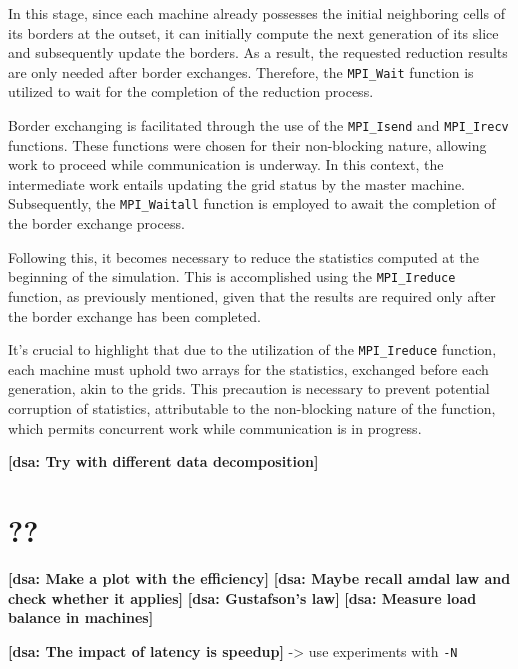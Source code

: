 \documentclass{article}
\newcommand{\dsanote}[1]{\textbf{[dsa: #1]}}
\begin{document}
In this stage, since each machine already possesses the initial neighboring cells of its borders at the outset, it 
can initially compute the next generation of its slice and subsequently update the borders. As a result, the requested 
reduction results are only needed after border exchanges. Therefore, the \texttt{MPI\_Wait} function is utilized to wait 
for the completion of the reduction process.


Border exchanging is facilitated through the use of the \texttt{MPI\_Isend} and \texttt{MPI\_Irecv} functions.
These functions were chosen for their non-blocking nature, allowing work to proceed while communication is underway. 
In this context, the intermediate work entails updating the grid status by the master machine. Subsequently, the 
\texttt{MPI\_Waitall} function is employed to await the completion of the border exchange process.

Following this, it becomes necessary to reduce the statistics computed at the beginning of the simulation. 
This is accomplished using the \texttt{MPI\_Ireduce} function, as previously mentioned, given that the results 
are required only after the border exchange has been completed.

It's crucial to highlight that due to the utilization of the \texttt{MPI\_Ireduce} function, each machine must uphold 
two arrays for the statistics, exchanged before each generation, akin to the grids. This precaution is necessary to 
prevent potential corruption of statistics, attributable to the non-blocking nature of the function, which permits concurrent 
work while communication is in progress.



\dsanote{Try with different data decomposition}

\section{??}

\dsanote{Make a plot with the efficiency}
\dsanote{Maybe recall amdal law and check whether it applies}
\dsanote{Gustafson's law}
\dsanote{Measure load balance in machines}

\dsanote{The impact of latency is speedup} -> use experiments with \texttt{-N}

\end{document}
